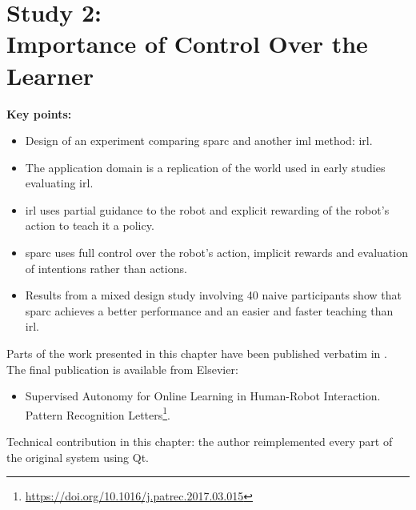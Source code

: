 \chapter[Study 2: Importance of Control Over the Learner]{Study 2: \\ Importance of Control Over the Learner}\label{chap:control}
\glsresetall
\graphicspath{{images/control/}}

\newcommand{\nosemic}{\SetEndCharOfAlgoLine{\relax}}%
\newcommand{\dosemic}{\SetEndCharOfAlgoLine{\string;}}%
\newcommand{\pushline}{\Indp}%
\newcommand{\popline}{\Indm\dosemic}%

\begin{framed}
	\textbf{Key points:}
	
	\begin{itemize}
		\item Design of an experiment comparing \acrshort{sparc} and another \acrshort{iml} method: \acrshort{irl}.
		\item The application domain is a replication of the world used in early studies evaluating \acrshort{irl}.
		\item \acrshort{irl} uses partial guidance to the robot and explicit rewarding of the robot's action to teach it a policy.
		\item \acrshort{sparc} uses full control over the robot's action, implicit rewards and evaluation of intentions rather than actions.
		\item Results from a mixed design study involving 40 naive participants show that \acrshort{sparc} achieves a better performance and an easier and faster teaching than \acrshort{irl}.
	\end{itemize}
\end{framed}

Parts of the work presented in this chapter have been published verbatim in \cite{senft2017supervised}. The final publication is available from Elsevier:
\begin{itemize}
	\item Supervised Autonomy for Online Learning in Human-Robot Interaction. Pattern Recognition Letters\footnote{\url{https://doi.org/10.1016/j.patrec.2017.03.015}}.
\end{itemize} 

Technical contribution in this chapter: the author reimplemented every part of the original system using Qt.


